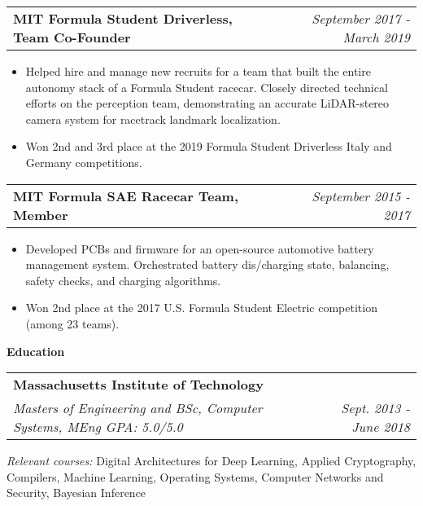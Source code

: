 \documentclass[letterpaper,11pt]{article}
\makeatletter
\newcommand{\resitem}[1]{\item[--] #1 \vspace{-4pt}}
\newcommand{\ressubheading}[4] {
\begin{tabular*}{7in}{l@{\extracolsep{\fill}}r}
	\textbf{#1} & \textit{#2} \\
	\textit{#3} & \textit{#4}\\
\end{tabular*}\vspace{-6pt}}
\newcommand{\ressubheadingtwo}[2] {
\begin{tabular*}{7in}{l@{\extracolsep{\fill}}r}
	\textbf{#1} & \textit{#2} \\
\end{tabular*}\vspace{-6pt}}
\makeatother
\begin{document}
    \ressubheadingtwo{MIT Formula Student Driverless, Team Co-Founder}{September 2017 - March 2019}
    \begin{itemize}
        \vspace{-1mm}
        \resitem{Helped hire and manage new recruits for a team that built the entire autonomy stack of a Formula Student racecar. Closely directed technical efforts on the perception team, demonstrating an accurate LiDAR-stereo camera system for racetrack landmark localization.}
        \vspace{-1mm}
        \resitem{Won 2nd and 3rd place at the 2019 Formula Student Driverless Italy and Germany competitions.}
    \end{itemize}

    \ressubheadingtwo{MIT Formula SAE Racecar Team, Member}{September 2015 - 2017}
    \begin{itemize}
        \resitem{Developed PCBs and firmware for an open-source automotive battery management system. Orchestrated battery dis/charging state, balancing, safety checks, and charging algorithms.}
        \resitem{Won 2nd place at the 2017 U.S. Formula Student Electric competition (among 23 teams).}
    \end{itemize}

\vspace{0.1in}

\large \textbf{Education\vspace{2mm}} \normalsize
\ressubheading{Massachusetts Institute of Technology}{}{\vspace{4mm}Masters of Engineering and BSc, Computer Systems,  MEng GPA: 5.0/5.0}{Sept. 2013 - June 2018}
\textit{Relevant courses:} Digital Architectures for Deep Learning, Applied Cryptography, Compilers, Machine Learning, Operating Systems, Computer Networks and Security, Bayesian Inference 

\vspace{0.1in}



\end{document}
